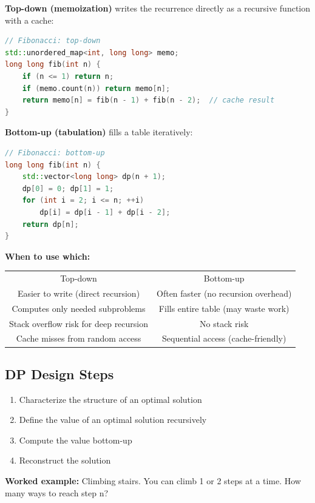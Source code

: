 \textbf{Top-down (memoization)} writes the recurrence directly as a recursive function with a cache:

\begin{lstlisting}[language=C++]
// Fibonacci: top-down
std::unordered_map<int, long long> memo;
long long fib(int n) {
    if (n <= 1) return n;
    if (memo.count(n)) return memo[n];
    return memo[n] = fib(n - 1) + fib(n - 2);  // cache result
}
\end{lstlisting}

\textbf{Bottom-up (tabulation)} fills a table iteratively:

\begin{lstlisting}[language=C++]
// Fibonacci: bottom-up
long long fib(int n) {
    std::vector<long long> dp(n + 1);
    dp[0] = 0; dp[1] = 1;
    for (int i = 2; i <= n; ++i)
        dp[i] = dp[i - 1] + dp[i - 2];
    return dp[n];
}
\end{lstlisting}

\textbf{When to use which:}
\begin{center}
\begin{tabular}{cc}
\toprule
Top-down & Bottom-up \\
Easier to write (direct recursion) & Often faster (no recursion overhead) \\
Computes only needed subproblems & Fills entire table (may waste work) \\
Stack overflow risk for deep recursion & No stack risk \\
Cache misses from random access & Sequential access (cache-friendly) \\
\bottomrule
\end{tabular}
\end{center}

\subsection{DP Design Steps}

\begin{enumerate}
\item Characterize the structure of an optimal solution
\item Define the value of an optimal solution recursively
\item Compute the value bottom-up
\item Reconstruct the solution
\end{enumerate}

\textbf{Worked example:} Climbing stairs. You can climb 1 or 2 steps at a time. How many ways to reach step n?

